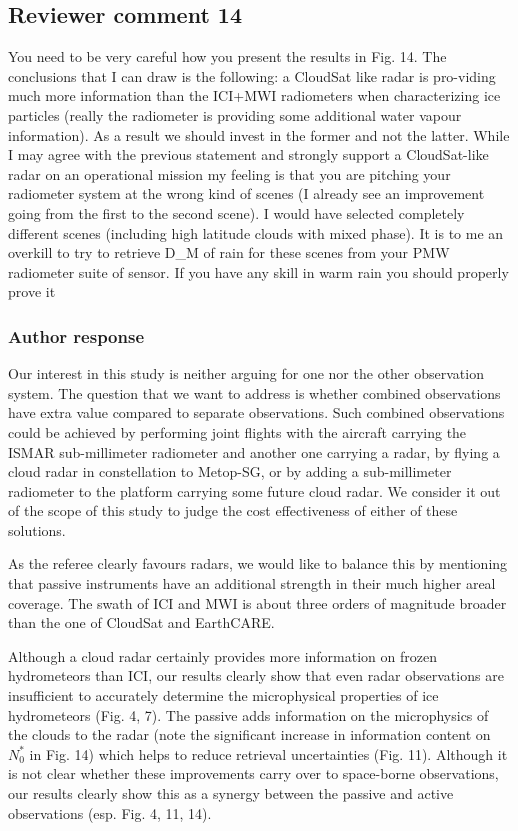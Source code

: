 \documentclass[11pt]{scrartcl}
\begin{document}
\subsection*{Reviewer comment 14}
You need to be very careful how you present the results in Fig. 14. The
conclusions that I can draw is the following: a CloudSat like radar is
pro-viding much more information than the ICI+MWI radiometers when
characterizing ice particles (really the radiometer is providing some additional
water vapour information). As a result we should invest in the former and not the
latter. While I may agree with the previous statement and strongly support a
CloudSat-like radar on an operational mission my feeling is that you are
pitching your radiometer system at the wrong kind of scenes (I already see an
improvement going from the first to the second scene). I would have selected
completely different scenes (including high latitude clouds with mixed phase). It
is to me an overkill to try to retrieve D\_M of rain for these scenes from your
PMW radiometer suite of sensor. If you have any skill in warm rain you
should properly prove it

\subsubsection*{Author response}

Our interest in this study is neither arguing for one nor the other observation
system. The question that we want to address is whether combined observations
have extra value compared to separate observations. Such combined observations
could be achieved by performing joint flights with the aircraft carrying the
ISMAR sub-millimeter radiometer and another one carrying a radar, by flying a
cloud radar in constellation to Metop-SG, or by adding a sub-millimeter
radiometer to the platform carrying some future cloud radar. We consider it out
of the scope of this study to judge the cost effectiveness of either of these
solutions.

As the referee clearly favours radars, we would like to balance this by mentioning that
passive instruments have an additional strength in their much higher areal coverage. The
swath of ICI and MWI is about three orders of magnitude broader than the one of CloudSat
and EarthCARE.

Although a cloud radar certainly provides more information on frozen
hydrometeors than ICI, our results clearly show that even radar observations are
insufficient to accurately determine the microphysical properties of ice
hydrometeors (Fig. 4, 7). The passive adds information on the microphysics of
the clouds to the radar (note the significant increase in information content on
$N_0^*$ in Fig. 14) which helps to reduce retrieval uncertainties (Fig. 11).
Although it is not clear whether these improvements carry over to space-borne
observations, our results clearly show this as a synergy between the passive and
active observations (esp. Fig. 4, 11, 14).
\end{document}

